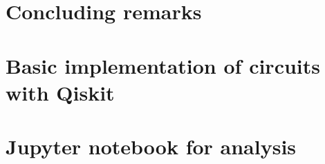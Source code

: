 \documentclass[twoside]{report}
\begin{document}
 \chapter{Concluding remarks}
 \label{chap:conlusion}
 
  \begin{appendices}
    \chapter{Basic implementation of circuits with Qiskit}
    \label{chap:app1}
      
    \chapter{Jupyter notebook for analysis}
      \label{chap:app2}
      
  \end{appendices}
  \printbibliography
\end{document}
